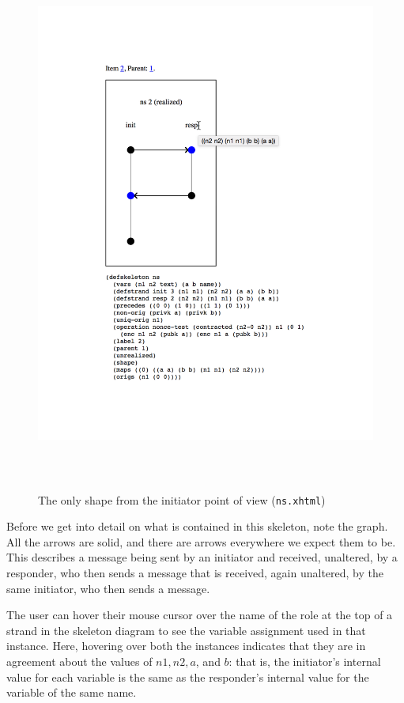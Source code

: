 \begin{figure}
\centering
\includegraphics[height=7in]{ns_skel2_cursor}
\caption[NS shape, initiator point of view]{The only shape from the
  initiator point of view (\texttt{ns.xhtml})}
\label{fig:ns init shape}
\end{figure}

Before we get into detail on what is contained in this skeleton, note
the graph.  All the arrows are solid, and there are arrows everywhere
we expect them to be.  This describes a message being sent by an
initiator and received, unaltered, by a responder, who then sends a
message that is received, again unaltered, by the same initiator, who
then sends a message.

 The user can hover their mouse cursor over
the name of the role at the top of a strand in the skeleton diagram to
see the variable assignment used in that instance.  Here, hovering
over both the instances indicates that they are in agreement about the
values of $n1, n2, a$, and $b$: that is, the initiator's internal
value for each variable is the same as the responder's internal value
for the variable of the same name.

